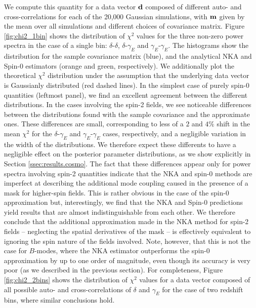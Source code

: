 \documentclass[a4paper,11pt]{article}
\begin{document}
      We compute this quantity for a data vector ${\bf d}$ composed of different auto- and cross-correlations for each of the 20,000 Gaussian simulations, with ${\bf m}$ given by the mean over all simulations and different choices of covariance matrix. Figure \ref{fig:chi2_1bin} shows the distribution of $\chi^2$ values for the three non-zero power spectra in the case of a single bin: $\delta$-$\delta$, $\delta$-$\gamma_E$ and $\gamma_E$-$\gamma_E$. The histograms show the distribution for the sample covariance matrix (blue), and the analytical NKA and Spin-0 estimators (orange and green, respectively). We additionally plot the theoretical $\chi^2$ distribution under the assumption that the underlying data vector is Gaussianly distributed (red dashed lines). In the simplest case of purely spin-0 quantities (leftmost panel), we find an excellent agreement between the different distributions. In the cases involving the spin-2 fields, we see noticeable differences between the distributions found with the sample covariance and the approximate ones. These differences are small, corresponding to less of a $2$ and $4\%$ shift in the mean $\chi^2$ for the $\delta$-$\gamma_E$ and $\gamma_E$-$\gamma_E$ cases, respectively, and a negligible variation in the width of the distributions. We therefore expect these differents to have a negligible effect on the posterior parameter distributions, as we show explicitly in Section \ref{ssec:results.cosmo}. The fact that these differences appear only for power spectra involving spin-2 quantities indicate that the NKA and spin-0 methods are imperfect at describing the additional mode coupling caused in the presence of a mask for higher-spin fields. This is rather obvious in the case of the spin-0 approximation but, interestingly, we find that the NKA and Spin-0 predictions yield results that are almost indistinguishable from each other. We therefore conclude that the additional approximation made in the NKA method for spin-2 fields -- neglecting the spatial derivatives of the mask -- is effectively equivalent to ignoring the spin nature of the fields involved. Note, however, that this is not the case for $B$-modes, where the NKA estimator outperforms the spin-0 approximation by up to one order of magnitude, even though its accuracy is very poor (as we described in the previous section). For completeness, Figure \ref{fig:chi2_2bins} shows the distribution of $\chi^2$ values for a data vector composed of all possible auto- and cross-correlations of $\delta$ and $\gamma_E$ for the case of two redshift bins, where similar conclusions hold.
\end{document}
